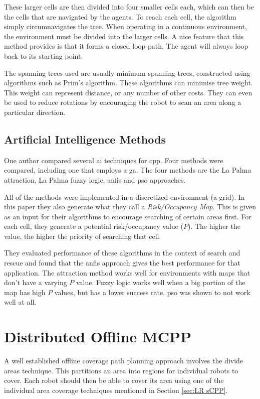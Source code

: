 These larger cells are then divided into four smaller cells each, which can then be the cells that are navigated by the agents. To reach each cell, the algorithm simply circumnavigates the tree. When operating in a continuous environment, the environment must be divided into the larger cells. A nice feature that this method provides is that it forms a closed loop path. The agent will always loop back to its starting point. \cite{Hazon2005} 

The spanning trees used are usually minimum spanning trees, constructed using algorithms such as Prim's algorithm. These algorithms can minimise tree weight. This weight can represent distance, or any number of other costs. They can even be used to reduce rotations by encouraging the robot to scan an area along a particular direction. \cite{Gabriely2001}

\subsection{Artificial Intelligence Methods}
\label{sec:LR - sAI}
One author compared several \ac{ai} techniques for \ac{cpp}. Four methods were compared, including one that employs a \ac{ga}. The four methods are the La Palma attraction, La Palma fuzzy logic, \ac{anfis} and \ac{pso} approaches. \cite{Juan2018}

All of the methods were implemented in a discretized environment (a grid). In this paper they also generate what they call a \emph{Risk/Occupancy Map}. This is given as an input for their algorithms to encourage searching of certain areas first. For each cell, they generate a potential risk/occupancy value ($P$). The higher the value, the higher the priority of searching that cell.

They evaluated performance of these algorithms in the context of search and rescue and found that the \ac{anfis} approach gives the best performance for that application. The attraction method works well for environments with maps that don't have a varying $P$ value. Fuzzy logic works well when a big portion of the map has high $P$ values, but has a lower success rate. \ac{pso} was shown to not work well at all.


\section{Distributed Offline MCPP}
\label{sec:LR Ditributed MCPP}
A well established offline coverage path planning approach involves the divide areas technique. This partitions an area into regions for individual robots to cover. Each robot should then be able to cover its area using one of the individual area coverage techniques mentioned in Section \ref{sec:LR sCPP}.
